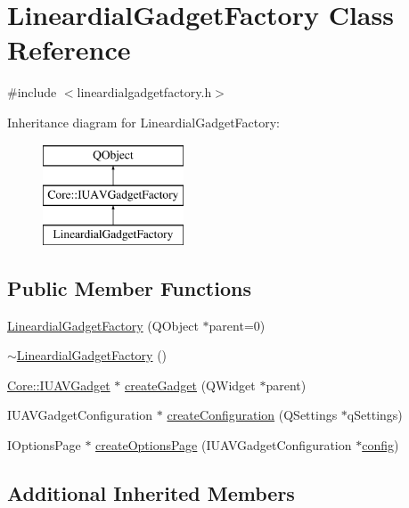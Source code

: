 \hypertarget{class_lineardial_gadget_factory}{\section{Lineardial\-Gadget\-Factory Class Reference}
\label{class_lineardial_gadget_factory}
}


{\ttfamily \#include $<$lineardialgadgetfactory.\-h$>$}

Inheritance diagram for Lineardial\-Gadget\-Factory\-:\begin{figure}[H]
\begin{center}
\leavevmode
\includegraphics[height=3.000000cm]{class_lineardial_gadget_factory}
\end{center}
\end{figure}
\subsection*{Public Member Functions}
\begin{DoxyCompactItemize}
\item 
\hyperlink{group___linear_dial_plugin_ga65f46ec9f31c70119c149accc51b304e}{Lineardial\-Gadget\-Factory} (Q\-Object $\ast$parent=0)
\item 
\hyperlink{group___linear_dial_plugin_ga85102065ae14d80cf83202637c76b94c}{$\sim$\-Lineardial\-Gadget\-Factory} ()
\item 
\hyperlink{class_core_1_1_i_u_a_v_gadget}{Core\-::\-I\-U\-A\-V\-Gadget} $\ast$ \hyperlink{group___linear_dial_plugin_gad0365f5bab013eac15acf924e0bc2821}{create\-Gadget} (Q\-Widget $\ast$parent)
\item 
I\-U\-A\-V\-Gadget\-Configuration $\ast$ \hyperlink{group___linear_dial_plugin_ga280a4a9d168f6d6b477c30630fdb128b}{create\-Configuration} (Q\-Settings $\ast$q\-Settings)
\item 
I\-Options\-Page $\ast$ \hyperlink{group___linear_dial_plugin_gab8b7a7edac05d576e192c715acf48a22}{create\-Options\-Page} (I\-U\-A\-V\-Gadget\-Configuration $\ast$\hyperlink{deflate_8c_a4473b5227787415097004fd39f55185e}{config})
\end{DoxyCompactItemize}
\subsection*{Additional Inherited Members}


